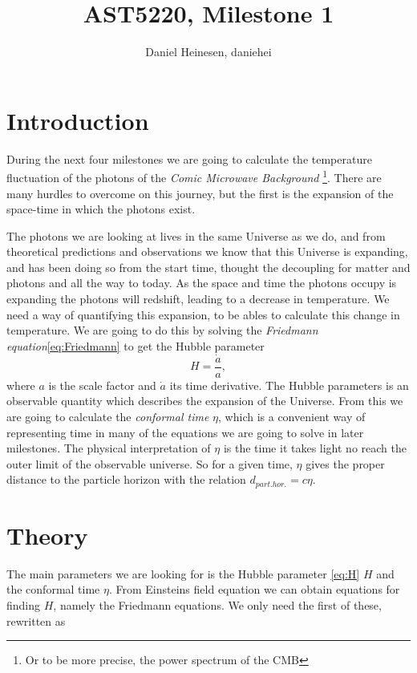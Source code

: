 \documentclass[a4paper,norsk, 10pt]{article}
\title{AST5220, Milestone 1}
\author{Daniel Heinesen, daniehei}
\begin{document}
\maketitle

\section{Introduction}
During the next four milestones we are going to calculate the temperature fluctuation of the photons of the \textit{Comic Microwave Background} \footnote{Or to be more precise, the power spectrum of the CMB}. There are many hurdles to overcome on this journey, but the first is the expansion of the space-time in which the photons exist.

The photons we are looking at lives in the same Universe as we do, and from theoretical predictions and observations we know that this Universe is expanding, and has been doing so from the start time, thought the decoupling for matter and photons and all the way to today. As the space and time the photons occupy is expanding the photons will redshift, leading to a decrease in temperature. 
We need a way of quantifying this expansion, to be ables to calculate this change in temperature. We are going to do this by solving the \textit{Friedmann equation}\eqref{eq:Friedmann} to get the Hubble parameter
\begin{equation}\label{eq:H}
H = \frac{\dot{a}}{a},
\end{equation}
where $a$ is the scale factor and $\dot{a}$ its time derivative. The Hubble parameters is an observable quantity which describes the expansion of the Universe. From this we are going to calculate the \textit{conformal time} $\eta$, which is a convenient way of representing time in many of the equations we are going to solve in later milestones. The physical interpretation of $\eta$ is the time it takes light no reach the outer limit of the observable universe. So for a given time, $\eta$  gives the proper distance to the particle horizon with the relation $d_{part. hor.} = c\eta$.


\section{Theory}


The main parameters we are looking for is the Hubble parameter \eqref{eq:H} $H$ and the conformal time $\eta$. From Einsteins field equation we can obtain equations for finding $H$, namely the Friedmann equations. We only need the first of these, rewritten as
\end{document}
